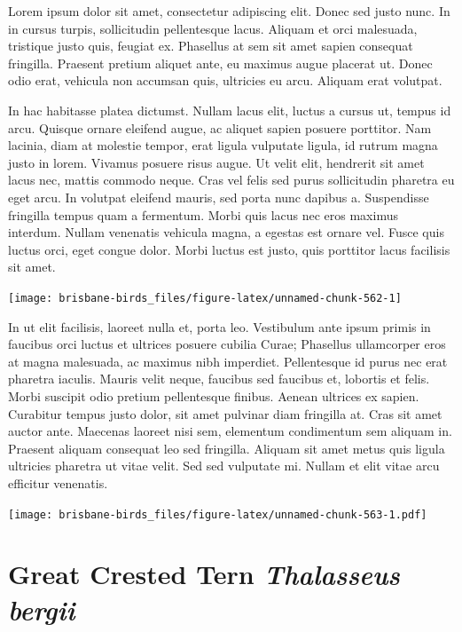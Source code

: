 \documentclass[]{book}
\let\origfigure\figure
\let\endorigfigure\endfigure
\renewenvironment{figure}[1][2] {
  \expandafter\origfigure\expandafter[H]
} {
  \endorigfigure
}
\begin{document}
Lorem ipsum dolor sit amet, consectetur adipiscing elit. Donec sed justo
nunc. In in cursus turpis, sollicitudin pellentesque lacus. Aliquam et
orci malesuada, tristique justo quis, feugiat ex. Phasellus at sem sit
amet sapien consequat fringilla. Praesent pretium aliquet ante, eu
maximus augue placerat ut. Donec odio erat, vehicula non accumsan quis,
ultricies eu arcu. Aliquam erat volutpat.

In hac habitasse platea dictumst. Nullam lacus elit, luctus a cursus ut,
tempus id arcu. Quisque ornare eleifend augue, ac aliquet sapien posuere
porttitor. Nam lacinia, diam at molestie tempor, erat ligula vulputate
ligula, id rutrum magna justo in lorem. Vivamus posuere risus augue. Ut
velit elit, hendrerit sit amet lacus nec, mattis commodo neque. Cras vel
felis sed purus sollicitudin pharetra eu eget arcu. In volutpat eleifend
mauris, sed porta nunc dapibus a. Suspendisse fringilla tempus quam a
fermentum. Morbi quis lacus nec eros maximus interdum. Nullam venenatis
vehicula magna, a egestas est ornare vel. Fusce quis luctus orci, eget
congue dolor. Morbi luctus est justo, quis porttitor lacus facilisis sit
amet.

\begin{figure}
\texttt{[image: brisbane-birds\_files/figure-latex/unnamed-chunk-562-1]} \caption{insert figure caption}\label{fig:unnamed-chunk-562}
\end{figure}

In ut elit facilisis, laoreet nulla et, porta leo. Vestibulum ante ipsum
primis in faucibus orci luctus et ultrices posuere cubilia Curae;
Phasellus ullamcorper eros at magna malesuada, ac maximus nibh
imperdiet. Pellentesque id purus nec erat pharetra iaculis. Mauris velit
neque, faucibus sed faucibus et, lobortis et felis. Morbi suscipit odio
pretium pellentesque finibus. Aenean ultrices ex sapien. Curabitur
tempus justo dolor, sit amet pulvinar diam fringilla at. Cras sit amet
auctor ante. Maecenas laoreet nisi sem, elementum condimentum sem
aliquam in. Praesent aliquam consequat leo sed fringilla. Aliquam sit
amet metus quis ligula ultricies pharetra ut vitae velit. Sed sed
vulputate mi. Nullam et elit vitae arcu efficitur venenatis.

\begin{figure}
\centering
\texttt{[image: brisbane-birds\_files/figure-latex/unnamed-chunk-563-1.pdf]}
\caption{\label{fig:unnamed-chunk-563}insert figure caption}
\end{figure}

\section{\texorpdfstring{Great Crested Tern \emph{Thalasseus
bergii}}{Great Crested Tern Thalasseus bergii}}\label{great-crested-tern-thalasseus-bergii}
\end{document}
